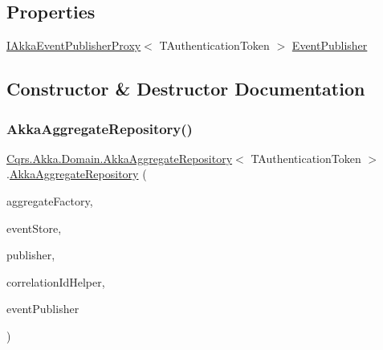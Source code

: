 \subsection*{Properties}
\begin{DoxyCompactItemize}
\item 
\hyperlink{interfaceCqrs_1_1Akka_1_1Events_1_1IAkkaEventPublisherProxy}{I\+Akka\+Event\+Publisher\+Proxy}$<$ T\+Authentication\+Token $>$ \hyperlink{classCqrs_1_1Akka_1_1Domain_1_1AkkaAggregateRepository_a6c6400aef33fd3ec5dc3e479ebec6b40_a6c6400aef33fd3ec5dc3e479ebec6b40}{Event\+Publisher}
\end{DoxyCompactItemize}


\subsection{Constructor \& Destructor Documentation}
\mbox{\label{classCqrs_1_1Akka_1_1Domain_1_1AkkaAggregateRepository_afc997ba5187ca08d3f81a0c204eda3a2_afc997ba5187ca08d3f81a0c204eda3a2}} 
\subsubsection{\texorpdfstring{Akka\+Aggregate\+Repository()}{AkkaAggregateRepository()}}
{\footnotesize\ttfamily \hyperlink{classCqrs_1_1Akka_1_1Domain_1_1AkkaAggregateRepository}{Cqrs.\+Akka.\+Domain.\+Akka\+Aggregate\+Repository}$<$ T\+Authentication\+Token $>$.\hyperlink{classCqrs_1_1Akka_1_1Domain_1_1AkkaAggregateRepository}{Akka\+Aggregate\+Repository} (\begin{DoxyParamCaption}\item[{\hyperlink{interfaceCqrs_1_1Domain_1_1Factories_1_1IAggregateFactory}{I\+Aggregate\+Factory}}]{aggregate\+Factory,  }\item[{\hyperlink{interfaceCqrs_1_1Events_1_1IEventStore}{I\+Event\+Store}$<$ T\+Authentication\+Token $>$}]{event\+Store,  }\item[{\hyperlink{interfaceCqrs_1_1Events_1_1IEventPublisher}{I\+Event\+Publisher}$<$ T\+Authentication\+Token $>$}]{publisher,  }\item[{I\+Correlation\+Id\+Helper}]{correlation\+Id\+Helper,  }\item[{\hyperlink{interfaceCqrs_1_1Akka_1_1Events_1_1IAkkaEventPublisherProxy}{I\+Akka\+Event\+Publisher\+Proxy}$<$ T\+Authentication\+Token $>$}]{event\+Publisher }\end{DoxyParamCaption})}



